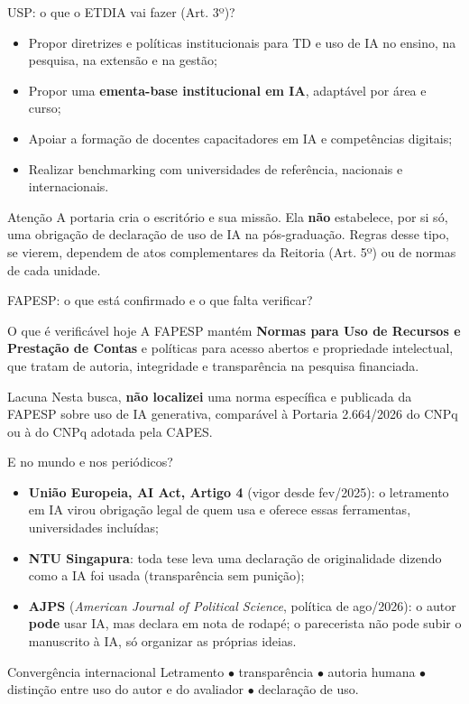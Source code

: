 \documentclass[11pt,aspectratio=169,t]{beamer}
\begin{document}
\begin{frame}{USP: o que o ETDIA vai fazer (Art. 3º)?}
  \small
  \begin{itemize}
    \item Propor diretrizes e políticas institucionais para TD e uso de IA no ensino, na pesquisa, na extensão e na gestão;
    \item Propor uma \textbf{ementa-base institucional em IA}, adaptável por área e curso;
    \item Apoiar a formação de docentes capacitadores em IA e competências digitais;
    \item Realizar benchmarking com universidades de referência, nacionais e internacionais.
  \end{itemize}
  \pause
  \vfill
  \begin{alertblock}{Atenção}
    A portaria cria o escritório e sua missão. Ela \textbf{não} estabelece, por si só, uma obrigação de declaração de uso de IA na pós-graduação. Regras desse tipo, se vierem, dependem de atos complementares da Reitoria (Art. 5º) ou de normas de cada unidade.
  \end{alertblock}
\end{frame}
\begin{frame}{FAPESP: o que está confirmado e o que falta verificar?}
  \begin{block}{O que é verificável hoje}
    A FAPESP mantém \textbf{Normas para Uso de Recursos e Prestação de Contas} e políticas para acesso abertos e propriedade intelectual, que tratam de autoria, integridade e transparência na pesquisa financiada.
  \end{block}
  \pause
  \begin{alertblock}{Lacuna}
    Nesta busca, \textbf{não localizei} uma norma específica e publicada da FAPESP sobre uso de IA generativa, comparável à Portaria 2.664/2026 do CNPq ou à do CNPq adotada pela CAPES.
  \end{alertblock}
\end{frame}
\begin{frame}{E no mundo e nos periódicos?}
  \small
  \begin{itemize}
    \item \textbf{União Europeia, AI Act, Artigo 4} (vigor desde fev/2025): o letramento em IA virou \alert{obrigação legal} de quem usa e oferece essas ferramentas, universidades incluídas;
    \pause
    \item \textbf{NTU Singapura}: toda tese leva uma declaração de originalidade dizendo como a IA foi usada (transparência sem punição);
    \pause
    \item \textbf{AJPS} (\textit{American Journal of Political Science}, política de ago/2026): o autor \textbf{pode} usar IA, mas declara em nota de rodapé; \alert{o parecerista não pode subir o manuscrito à IA}, só organizar as próprias ideias.
  \end{itemize}
  \pause
  \vspace{0.15cm}
  \begin{block}{Convergência internacional}
    Letramento $\bullet$ transparência $\bullet$ autoria humana $\bullet$ distinção entre uso do autor e do avaliador $\bullet$ declaração de uso.
  \end{block}
\end{frame}
\end{document}
